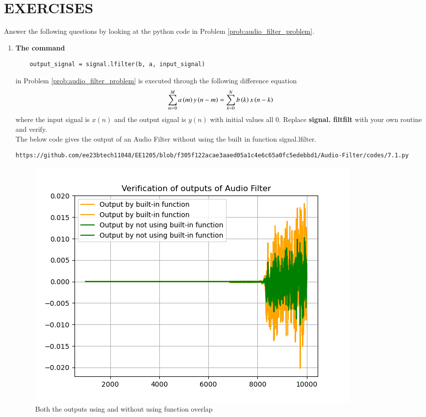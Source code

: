 \documentclass[journal,12pt,twocolumn]{IEEEtran}
\theoremstyle{remark}
\begin{document}
\section{EXERCISES}
\noindent Answer the following questions by looking at the python code in Problem \ref{prob:audio_filter_problem}.
\begin{enumerate}[label=\thesection.\arabic*,ref=\thesection.\theenumi]
\item
\textbf{The command}
\begin{lstlisting}
	output_signal = signal.lfilter(b, a, input_signal)
	\end{lstlisting}
in Problem \ref{prob:audio_filter_problem} is executed through the following difference equation
\begin{equation}
\label{eq:iir_filter_gen}
 \sum _{m=0}^{M}a\left(m\right)y\left(n-m\right)=\sum _{k=0}^{N}b\left(k\right)x\left(n-k\right) 
\end{equation}
%
where the input signal is $x(n)$ and the output signal is $y(n)$ with initial values all 0. Replace
\textbf{signal. filtfilt} with your own routine and verify.\\

\solution The below code gives the output of an Audio Filter without using the built in function signal.lfilter.
\begin{lstlisting}
https://github.com/ee23btech11048/EE1205/blob/f305f122acae3aaed05a1c4e6c65a0fc5edebbd1/Audio-Filter/codes/7.1.py
\end{lstlisting}
\begin{figure}[H]
\centering
\includegraphics[width=\columnwidth]{figs/Audio_Filter_verf.png}
\caption{Both the outputs using and without using function overlap}
\label{fig:7.1}
\end{figure}


\end{enumerate}
\end{document}
